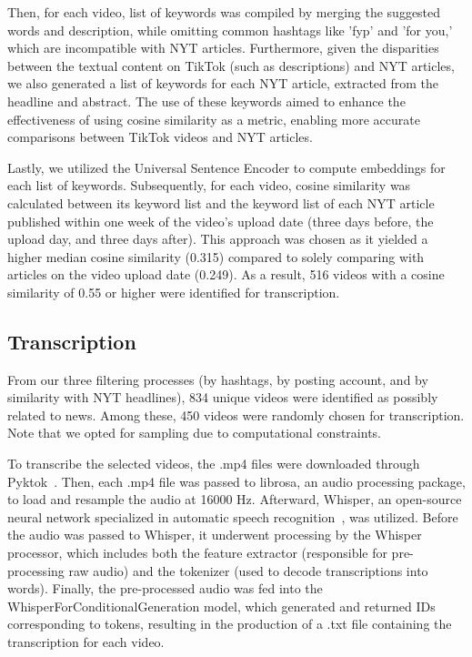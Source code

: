 \documentclass{article}
\begin{document}
{\noindent}Then, for each video, list of keywords was compiled by merging the suggested words and description, while omitting common hashtags like 'fyp' and 'for you,' which are incompatible with NYT articles. Furthermore, given the disparities between the textual content on TikTok (such as descriptions) and NYT articles, we also generated a list of keywords for each NYT article, extracted from the headline and abstract. The use of these keywords aimed to enhance the effectiveness of using cosine similarity as a metric, enabling more accurate comparisons between TikTok videos and NYT articles. \newline

{\noindent}Lastly, we utilized the Universal Sentence Encoder to compute embeddings for each list of keywords. Subsequently, for each video, cosine similarity was calculated between its keyword list and the keyword list of each NYT article published within one week of the video's upload date (three days before, the upload day, and three days after). This approach was chosen as it yielded a higher median cosine similarity (0.315) compared to solely comparing with articles on the video upload date (0.249). As a result, 516 videos with a cosine similarity of 0.55 or higher were identified for transcription.

\subsection{Transcription}
From our three filtering processes (by hashtags, by posting account, and by similarity with NYT headlines), 834 unique videos were identified as possibly related to news. Among these, 450 videos were randomly chosen for transcription. Note that we opted for sampling due to computational constraints. \newline

{\noindent}To transcribe the selected videos, the .mp4 files were downloaded through Pyktok~\cite{pyktok}. Then, each .mp4 file was passed to librosa, an audio processing package, to load and resample the audio at 16000 Hz. Afterward, Whisper, an open-source neural network specialized in automatic speech recognition~\cite{whisper_repo}, was utilized. Before the audio was passed to Whisper, it underwent processing by the Whisper processor, which includes both the feature extractor (responsible for pre-processing raw audio) and the tokenizer (used to decode transcriptions into words). Finally, the pre-processed audio was fed into the WhisperForConditionalGeneration model, which generated and returned IDs corresponding to tokens, resulting in the production of a .txt file containing the transcription for each video.\newline
\end{document}
